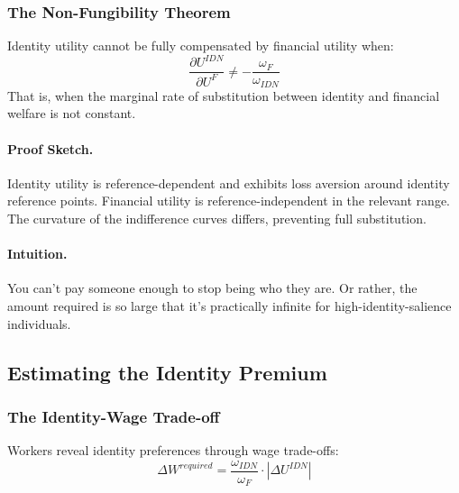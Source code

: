 \subsubsection{The Non-Fungibility Theorem}

\begin{theorem}
Identity utility cannot be fully compensated by financial utility when:
\begin{equation}
\frac{\partial U^{IDN}}{\partial U^F} \neq -\frac{\omega_F}{\omega_{IDN}}
\end{equation}
That is, when the marginal rate of substitution between identity and 
financial welfare is not constant.
\end{theorem}

\paragraph{Proof Sketch.}
Identity utility is reference-dependent and exhibits loss aversion 
around identity reference points. Financial utility is reference-independent 
in the relevant range. The curvature of the indifference curves differs, 
preventing full substitution.

\paragraph{Intuition.}
You can't pay someone enough to stop being who they are. Or rather, 
the amount required is so large that it's practically infinite for 
high-identity-salience individuals.

\subsection{Estimating the Identity Premium}

\subsubsection{The Identity-Wage Trade-off}

Workers reveal identity preferences through wage trade-offs:
\begin{equation}
\Delta W^{required} = \frac{\omega_{IDN}}{\omega_F} \cdot |\Delta U^{IDN}|
\label{eq:wage-premium}
\end{equation}

